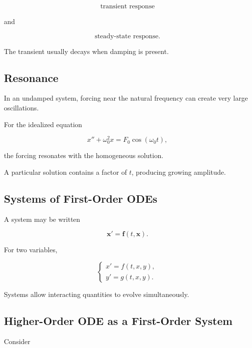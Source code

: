 \[
\boxed{
\text{transient response}
}
\]

and

\[
\boxed{
\text{steady-state response}.
}
\]

The transient usually decays when damping is present.

\subsection{Resonance}
\label{subsec:ode-resonance}

In an undamped system, forcing near the natural frequency can create very
large oscillations.

For the idealized equation

\[
\boxed{
x''
+
\omega_0^2x
=
F_0\cos(\omega_0t),
}
\]

the forcing resonates with the homogeneous solution.

A particular solution contains a factor of \(t\), producing growing
amplitude.

\subsection{Systems of First-Order ODEs}
\label{subsec:first-order-ode-systems}

A system may be written

\[
\boxed{
\mathbf{x}'
=
\mathbf{f}
(
t,\mathbf{x}
).
}
\]

For two variables,

\[
\boxed{
\begin{cases}
x'=f(t,x,y),\\
y'=g(t,x,y).
\end{cases}
}
\]

Systems allow interacting quantities to evolve simultaneously.

\subsection{Higher-Order ODE as a First-Order System}
\label{subsec:higher-order-to-system}

Consider

